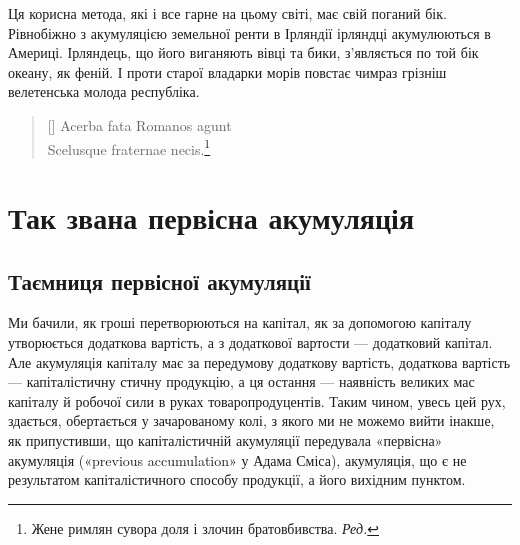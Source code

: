 Ця корисна метода, які і все гарне на цьому світі, має свій
поганий бік. Рівнобіжно з акумуляцією земельної ренти в Ірляндії
ірляндці акумулюються в Америці. Ірляндець, що його виганяють
вівці та бики, з’являється по той бік океану, як феній.
І проти старої владарки морів повстає чимраз грізніш велетенська
молода республіка.

\settowidth{\versewidth}{Scelusque fraternae necis.} 
\begin{verse}[\versewidth]
Acerba fata Romanos agunt \\
Scelusque fraternae necis.\footnote*{
Жене римлян сувора доля і злочин братовбивства. \emph{Ред.}
}
\end{verse}

\section{Так звана первісна акумуляція}

\subsection{Таємниця первісної акумуляції}

Ми бачили, як гроші перетворюються на капітал, як за допомогою
капіталу утворюється додаткова вартість, а з додаткової
вартости — додатковий капітал. Але акумуляція капіталу має за
передумову додаткову вартість, додаткова вартість — капіталістичну
стичну продукцію, а ця остання — наявність великих мас капіталу
й робочої сили в руках товаропродуцентів. Таким чином,
увесь цей рух, здається, обертається у зачарованому колі, з
якого ми не можемо вийти інакше, як припустивши, що капіталістичній
акумуляції передувала «первісна» акумуляція («previous
accumulation» у Адама Сміса), акумуляція, що є не результатом
капіталістичного способу продукції, а його вихідним пунктом.

